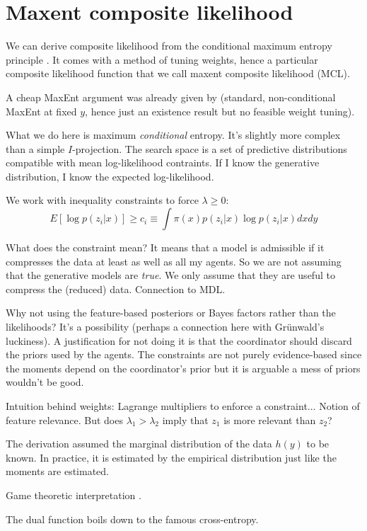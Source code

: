 \documentclass[english]{scrartcl}
\begin{document}
\section{Maxent composite likelihood}
\label{sec:maxent}

We can derive composite likelihood from the conditional maximum entropy principle \cite{BergerA-96}. It comes with a method of tuning weights, hence a particular composite likelihood function that we call maxent composite likelihood (MCL).

A cheap MaxEnt argument was already given by \cite{Wang-14}  (standard, non-conditional MaxEnt at fixed $y$, hence just an existence result but no feasible weight tuning).

What we do here is maximum {\em conditional} entropy. It's slightly more complex than a simple $I$-projection. The search space is a set of predictive distributions compatible with mean log-likelihood contraints. If I know the generative distribution, I know the expected log-likelihood.

We work with inequality constraints to force $\lambda\geq 0$:
$$
E[\log p(z_i|x)] \geq c_i \equiv \int \pi(x)p(z_i|x) \log p(z_i|x) dx dy
$$

What does the constraint mean? It means that a model is admissible if it compresses the data at least as well as all my agents. So we are not assuming that the generative models are {\em true}. We only assume that they are useful to compress the (reduced) data. Connection to MDL. 

Why not using the feature-based posteriors or Bayes factors rather than the likelihoods? It's a possibility (perhaps a connection here with Gr\"unwald's luckiness). A justification for not doing it is that the coordinator should discard the priors used by the agents. The constraints are not purely evidence-based since the moments depend on the coordinator's prior but it is arguable a mess of priors wouldn't be good.

Intuition behind weights: Lagrange multipliers to enforce a constraint... Notion of feature relevance. But does $\lambda_1>\lambda_2$ imply that $z_1$ is more relevant than $z_2$? 

The derivation assumed the marginal distribution of the data $h(y)$ to be known. In practice, it is estimated by the empirical distribution just like the moments are estimated.

Game theoretic interpretation \cite{Grunwald-04}.

The dual function boils down to the famous cross-entropy.
\end{document}
